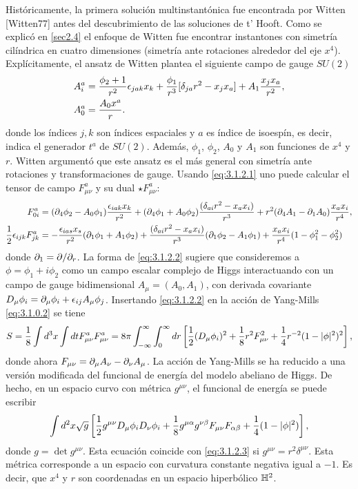 Históricamente, la primera solución multinstantónica fue encontrada por Witten [Witten77] antes del descubrimiento de las soluciones de t' Hooft. Como se explicó en \ref{sec2.4} el enfoque de Witten fue encontrar instantones con simetría cilíndrica en cuatro dimensiones (simetría ante rotaciones alrededor del eje $x^4$). Explícitamente, el ansatz de Witten plantea el siguiente campo de gauge $SU(2)$
\begin{align} \label{eq:3.1.2.1}
	\begin{split}
	A_i^a &= \frac{\phi_2+1}{r^2}\epsilon_{jak}x_k+\frac{\phi_1}{r^3}[\delta_{ja}r^2-x_jx_a]+A_1\frac{x_jx_a}{r^2},\\
	A_0^a &= \frac{A_0x^a}{r}.
	\end{split}
\end{align}
donde los índices $j,k$ son índices espaciales y $a$ es índice de isoespín, es decir, indica el generador $t^a$ de $SU(2)$. Además, $\phi_1$, $\phi_2$, $A_0$ y $A_1$ son funciones de $x^4$ y $r$. Witten argumentó que este ansatz es el más general con simetría ante rotaciones y transformaciones de gauge. Usando \eqref{eq:3.1.2.1} uno puede calcular el tensor de campo $F_{\mu\nu}^a$ y su dual $\star F_{\mu\nu}^a$:
\begin{align}\label{eq:3.1.2.2}
	\begin{split}
	F_{0i}^a &= (\partial_4\phi_2-A_0\phi_1)\frac{\epsilon_{iak}x_k}{r^2}+(\partial_4\phi_1+A_0\phi_2)\frac{(\delta_{ai}r^2-x_a x_i)}{r^3}+r^2(\partial_4 A_1-\partial_1 A_0)\frac{x_ax_i}{r^4},\\
	\frac{1}{2}\epsilon_{ijk}F_{jk}^a &=-\frac{\epsilon_{ias}x_s}{r^2}(\partial_1\phi_1+A_1\phi_2)+\frac{(\delta_{ai}r^2-x_a x_i)}{r^3}(\partial_1\phi_2-A_1\phi_1)+\frac{x_ax_i}{r^4}(1-\phi_1^2-\phi_2^2)
	\end{split}
\end{align}
donde $\partial_1=\partial/\partial_r$. La forma de \eqref{eq:3.1.2.2} sugiere que consideremos a $\phi=\phi_1+i\phi_2$ como un campo escalar complejo de Higgs interactuando con un campo de gauge bidimensional $A_\mu=(A_0,A_1)$, con derivada covariante $D_\mu\phi_i=\partial_\mu\phi_i+\epsilon_{ij}A_\mu\phi_j$. Insertando \eqref{eq:3.1.2.2} en la acción de Yang-Mills \eqref{eq:3.1.0.2} se tiene
\begin{align}
	S = \frac{1}{8}\int d^3x\int dt F_{\mu\nu}^a F_{\mu\nu}^a = 8\pi\int_{-\infty}^{\infty}\int_0^\infty dr\left[\frac{1}{2}(D_\mu\phi_i)^2+\frac{1}{8}r^2 F_{\mu\nu}^2+\frac{1}{4}r^{-2}(1-|\phi|^2)^2\right], \label{eq:3.1.2.3}
\end{align}
donde ahora $F_{\mu\nu}=\partial_\mu A_\nu-\partial_\nu A_\mu$. La acción de Yang-Mills se ha reducido a una versión modificada del funcional de energía del modelo abeliano de Higgs. De hecho, en un espacio curvo con métrica $g^{\mu\nu}$, el funcional de energía se puede escribir
\begin{align}
	\int d^2x\sqrt{g}\left[\frac{1}{2}g^{\mu\nu}D_\mu\phi_i D_\nu\phi_i+\frac{1}{8} g^{\mu\alpha}g^{\nu\beta}F_{\mu\nu}F_{\alpha\beta}+\frac{1}{4}(1-|\phi|^2)\right], \label{eq:3.1.2.4}
\end{align}
donde $g=\det g^{\mu\nu}$. Esta ecuación coincide con \eqref{eq:3.1.2.3} si $g^{\mu\nu}=r^2\delta^{\mu\nu}$. Esta métrica corresponde a un espacio con curvatura constante negativa igual a $-1$. Es decir, que $x^4$ y $r$ son coordenadas en un espacio hiperbólico $\mathbb{H}^2$.

